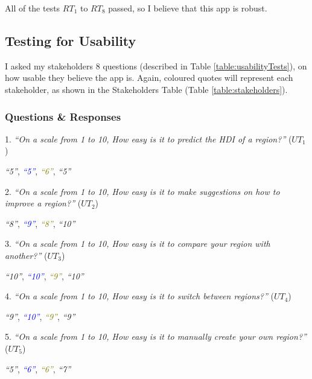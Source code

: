 \documentclass[12pt]{report}
\begin{document}
All of the tests $RT_{1}$ to $RT_{8}$ passed, so I believe that this app is robust.

\subsection{Testing for Usability}\label{sec:testingUsability}
I asked my stakeholders 8 questions (described in Table \ref{table:usabilityTests}), on how usable they believe the app is. Again, coloured quotes will represent each stakeholder, as shown in the Stakeholders Table (Table \ref{table:stakeholders}).

\subsubsection{Questions \& Responses}
1. \textit{``On a scale from 1 to 10, How easy is it to predict the HDI of a region?''} ($UT_{1}$)
\begin{flushright}
\textit{\textcolor{Sepia}{``5''}}, \textit{\textcolor{Blue}{``5''}}, \textit{\textcolor{olive}{``6''}}, \textit{\textcolor{OliveGreen}{``5''}}
\end{flushright}
2. \textit{``On a scale from 1 to 10, How easy is it to make suggestions on how to improve a region?''} ($UT_{2}$)
\begin{flushright}
\textit{\textcolor{Sepia}{``8''}}, \textit{\textcolor{Blue}{``9''}}, \textit{\textcolor{olive}{``8''}}, \textit{\textcolor{OliveGreen}{``10''}}
\end{flushright}
3. \textit{``On a scale from 1 to 10, How easy is it to compare your region with another?''} ($UT_{3}$)
\begin{flushright}
\textit{\textcolor{Sepia}{``10''}}, \textit{\textcolor{Blue}{``10''}}, \textit{\textcolor{olive}{``9''}}, \textit{\textcolor{OliveGreen}{``10''}}
\end{flushright}
4. \textit{``On a scale from 1 to 10, How easy is it to switch between regions?''} ($UT_{4}$)
\begin{flushright}
\textit{\textcolor{Sepia}{``9''}}, \textit{\textcolor{Blue}{``10''}}, \textit{\textcolor{olive}{``9''}}, \textit{\textcolor{OliveGreen}{``9''}}
\end{flushright}
5. \textit{``On a scale from 1 to 10, How easy is it to manually create your own region?''} ($UT_{5}$)
\begin{flushright}
\textit{\textcolor{Sepia}{``5''}}, \textit{\textcolor{Blue}{``6''}}, \textit{\textcolor{olive}{``6''}}, \textit{\textcolor{OliveGreen}{``7''}}
\end{flushright}
\end{document}
